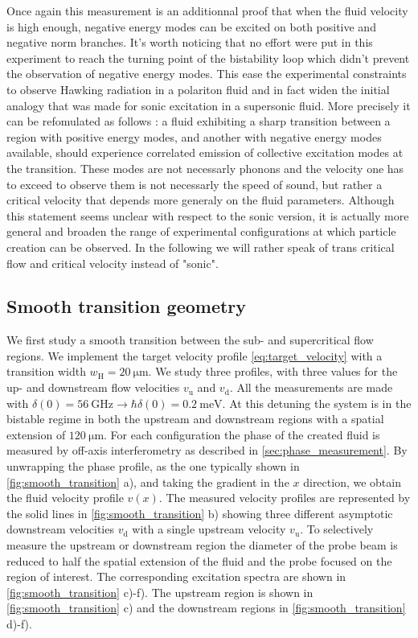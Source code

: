 Once again this measurement is an additionnal proof that when the fluid velocity is high enough, negative energy modes can be excited on both positive and negative norm branches.
It's worth noticing that no effort were put in this experiment to reach the turning point of the bistability loop which didn't prevent the observation of negative energy modes. This ease 
the experimental constraints to observe Hawking radiation in a polariton fluid and in fact widen the initial analogy that was made for sonic excitation in a supersonic fluid. More precisely it can be refomulated as follows :
a fluid exhibiting a sharp transition between a region with positive energy modes, and another with negative energy modes available, should experience correlated emission of collective excitation modes at the transition.
These modes are not necessarly phonons and the velocity one has to exceed to observe them is not necessarly the speed of sound, but rather a critical velocity that depends more generaly on the fluid parameters.
Although this statement seems unclear with respect to the sonic version, it is actually more general and broaden the range of experimental configurations at which particle creation can be observed. In the following 
we will rather speak of trans critical flow and critical velocity instead of "sonic".






\subsection{Smooth transition geometry}

We first study a smooth transition between the sub- and supercritical flow regions.
We implement the target velocity profile \autoref{eq:target_velocity} with a transition width $w_\mathrm{H}=\SI{20}{\micro\meter}$. 
We study three profiles, with three values for the up- and downstream flow velocities $v_\mathrm{u}$ and $v_\mathrm{d}$.
All the measurements are made with $\delta(0)=\SI{56}{\giga\hertz}\rightarrow \hbar\delta(0)= \SI{0.2}{\milli \electronvolt}$.
At this detuning the system is in the bistable regime in both the upstream and downstream regions with a spatial extension of $\SI{120}{\micro \meter}$.
For each configuration the phase of the created fluid is measured by off-axis interferometry as described in \autoref{sec:phase_measurement}. By unwrapping the phase profile, as the one typically shown in \autoref{fig:smooth_transition} a), and taking the gradient in the $x$ direction, we obtain the fluid velocity profile $v(x)$.
The measured velocity profiles are represented by the solid lines in \autoref{fig:smooth_transition} b) showing three different asymptotic downstream velocities $v_\mathrm{d}$ with a single upstream velocity $v_\mathrm{u}$. 
To selectively measure the upstream or downstream region the diameter of the probe beam is reduced to half the spatial extension of the fluid and the probe focused on the region of interest. The corresponding excitation spectra are shown in \autoref{fig:smooth_transition} c)-f). 
The upstream region is shown in \autoref{fig:smooth_transition} c) and the downstream regions in \autoref{fig:smooth_transition} d)-f).

